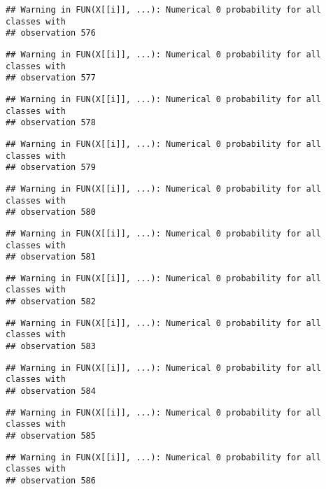 \documentclass[
]{article}
\begin{document}
\begin{verbatim}
## Warning in FUN(X[[i]], ...): Numerical 0 probability for all classes with
## observation 576
\end{verbatim}

\begin{verbatim}
## Warning in FUN(X[[i]], ...): Numerical 0 probability for all classes with
## observation 577
\end{verbatim}

\begin{verbatim}
## Warning in FUN(X[[i]], ...): Numerical 0 probability for all classes with
## observation 578
\end{verbatim}

\begin{verbatim}
## Warning in FUN(X[[i]], ...): Numerical 0 probability for all classes with
## observation 579
\end{verbatim}

\begin{verbatim}
## Warning in FUN(X[[i]], ...): Numerical 0 probability for all classes with
## observation 580
\end{verbatim}

\begin{verbatim}
## Warning in FUN(X[[i]], ...): Numerical 0 probability for all classes with
## observation 581
\end{verbatim}

\begin{verbatim}
## Warning in FUN(X[[i]], ...): Numerical 0 probability for all classes with
## observation 582
\end{verbatim}

\begin{verbatim}
## Warning in FUN(X[[i]], ...): Numerical 0 probability for all classes with
## observation 583
\end{verbatim}

\begin{verbatim}
## Warning in FUN(X[[i]], ...): Numerical 0 probability for all classes with
## observation 584
\end{verbatim}

\begin{verbatim}
## Warning in FUN(X[[i]], ...): Numerical 0 probability for all classes with
## observation 585
\end{verbatim}

\begin{verbatim}
## Warning in FUN(X[[i]], ...): Numerical 0 probability for all classes with
## observation 586
\end{verbatim}
\end{document}
